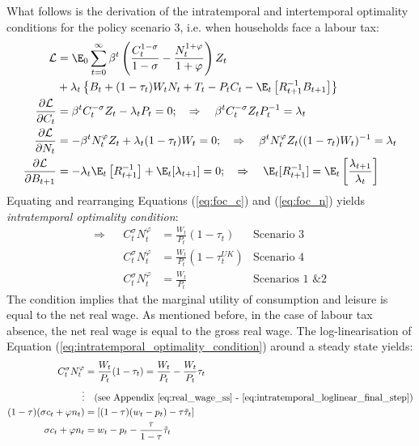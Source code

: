 What follows is the derivation of the intratemporal and intertemporal optimality conditions for the policy scenario 3, i.e. when households face a labour tax:
\begin{align}
    \mathcal{L} & = \E_0 \sum^{\infty}_{t=0} \beta^t \left( \frac{C_t^{1-\sigma}}{1-\sigma} - \frac{N_t^{1+\varphi}}{1+\varphi} \right)Z_t  \nonumber \\ &+ \lambda_t\left\{  B_t + (1-\tau_t) W_t N_t + T_t - P_t C_t - \E_t \left[R^{-1}_{t+1}B_{t+1} \right] \right\}\\
    \frac{\partial \mathcal{L}}{\partial C_t}                                    & = \beta^t C_t^{-\sigma}Z_t - \lambda_t P_t = 0; \quad \Rightarrow \quad \beta^t C_t^{-\sigma}Z_t P_{t}^{-1} = \lambda_t \label{eq:foc_c} \\
    \frac{\partial \mathcal{L}}{\partial N_t}                                    & = -\beta^t N_t^{\varphi}Z_t + \lambda_t (1-\tau_t) W_t = 0; \quad \Rightarrow \quad \beta^t N_t^{\varphi} Z_t ((1-\tau_t)W_{t})^{-1} = \lambda_t \label{eq:foc_n} \\
    \frac{\partial \mathcal{L}}{\partial B_{t+1}} & = -\lambda_t \E_t \left[ R^{-1}_{t+1}  \right] + \E_t[\lambda_{t+1}] = 0; \quad \Rightarrow \quad \E_t[R^{-1}_{t+1}] = \E_t \left[\frac{\lambda_{t+1}}{\lambda_t}\right] \label{eq:foc_b}
\end{align}
Equating and rearranging Equations (\ref{eq:foc_c}) and (\ref{eq:foc_n}) yields \textit{intratemporal optimality condition}:
\begin{align}
    \Rightarrow &  & C_t^{\sigma} N_t^{\varphi} &=  \frac{W_t}{P_t}(1-\tau_t) \label{eq:intratemporal_optimality_condition} &  \text{Scenario 3} \\
    & & C_t^{\sigma} N_t^{\varphi} &=  \frac{W_t}{P_t}(1-\tau^{UK}_t) & \text{Scenario 4} \\
    & & C_t^{\sigma} N_t^{\varphi} &=  \frac{W_t}{P_t} & \text{Scenarios 1 \& 2}
\end{align}
The condition implies that the marginal utility of consumption and leisure is equal to the net real wage. As mentioned before, in the case of labour tax absence, the net real wage is equal to the gross real wage. The log-linearisation of Equation (\ref{eq:intratemporal_optimality_condition}) around a steady state yields:
\begin{align}
    C_t^\sigma N_t^\varphi &= \frac{W_t}{P_t}(1-\tau_t) = \frac{W_t}{P_t} - \frac{W_t}{P_t}\tau_t \nonumber\\
    \vdots & \quad \text{(see Appendix \ref{eq:real_wage_ss} - \ref{eq:intratemporal_loglinear_final_step})}\nonumber\\
    (1-\tau)({\sigma c_t + \varphi n_t})  &= \left[(1-\tau)({w_t - p_t}) - \tau \tilde{\tau}_t\right]\nonumber\\
    {\sigma c_t + \varphi n_t}  &= {w_t - p_t} - \frac{\tau}{1-\tau}\tilde{\tau}_t
\end{align}
